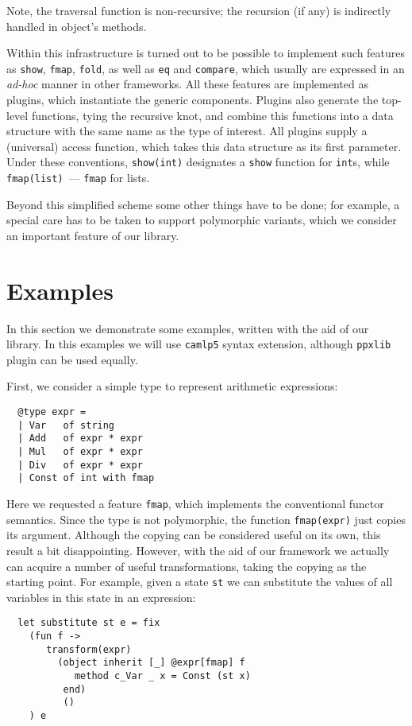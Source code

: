 \documentclass[twocolumn,8pt]{extarticle}
\newcommand{\cd}[1]{\texttt{#1}}
\begin{document}
Note, the traversal function is non-recursive; the recursion (if any) is indirectly handled in object's methods.

Within this infrastructure is turned out to be possible to implement such features as \cd{show}, \cd{fmap}, \cd{fold},
as well as \cd{eq} and \cd{compare}, which usually are expressed in an \emph{ad-hoc} manner in other frameworks. All these features are
implemented as plugins, which instantiate the generic components. Plugins also generate the top-level functions, tying the recursive knot,
and combine this functions into a data structure with the same name as the type of interest. All plugins supply a (universal) access function,
which takes this data structure as its first parameter. Under these conventions, \cd{show(int)} designates a \cd{show} function for \cd{int}s,
while \cd{fmap(list)}~--- \cd{fmap} for lists.

Beyond this simplified scheme some other things have to be done; for example, a special care has to be taken to support polymorphic variants, which
we consider an important feature of our library.

\section{Examples}

In this section we demonstrate some examples, written with the aid of our library. In this examples we will use \cd{camlp5} syntax extension,
although \cd{ppxlib} plugin can be used equally.

First, we consider a simple type to represent arithmetic expressions:

\begin{lstlisting}
  @type expr =
  | Var   of string
  | Add   of expr * expr
  | Mul   of expr * expr
  | Div   of expr * expr
  | Const of int with fmap
\end{lstlisting}

Here we requested a feature \cd{fmap}, which implements the conventional functor semantics. Since the type is not polymorphic, the function \cd{fmap(expr)}
just copies its argument. Although the copying can be considered useful on its own, this result a bit disappointing. However, with the aid of our framework we
actually can acquire a number of useful transformations, taking the copying as the starting point. For example, given a state \cd{st} we can substitute the
values of all variables in this state in an expression:

\begin{lstlisting}
  let substitute st e = fix
    (fun f ->
       transform(expr)
         (object inherit [_] @expr[fmap] f
            method c_Var _ x = Const (st x)
          end)
          ()
    ) e
\end{lstlisting}
\end{document}
